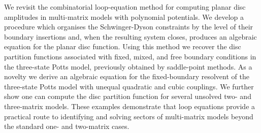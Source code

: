We revisit the combinatorial loop-equation method for computing planar disc amplitudes in
multi-matrix models with polynomial potentials. We develop a procedure which organises the Schwinger-Dyson
constraints by the level of their boundary insertions and, when the resulting system closes,
produces an algebraic equation for the planar disc function. Using this method we recover the disc
partition functions associated with fixed, mixed, and free boundary conditions in the three-state
Potts model, previously obtained by saddle-point methods. As a novelty we derive an algebraic equation for the fixed-boundary resolvent of the three-state Potts model with unequal quadratic and cubic couplings. We further show one can compute the disc
partition function for several unsolved two- and three-matrix models. These examples demonstrate that
loop equations provide a practical route to identifying and solving sectors of
multi-matrix models beyond the standard one- and two-matrix cases.